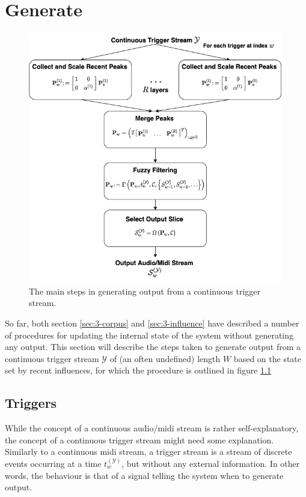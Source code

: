\chapter{Generate}\label{sec:3-generate}
 \begin{figure}[h!]
    \centering        
 	\includegraphics[width=0.99\textwidth]{figures/3-somax-generate.png}
    \caption{The main steps in generating output from a continuous trigger stream.}
    \label{fig:3-somax-generate}
\end{figure}

So far, both section \ref{sec:3-corpus} and \ref{sec:3-influence} have described a number of procedures for updating the internal state of the system without generating any output. This section will describe the steps taken to generate output from a continuous trigger stream $\mathcal Y$ of (an often undefined) length $W$ based on the state set by recent influences, for which the procedure is outlined in figure \ref{fig:3-somax-generate}

\section{Triggers}\label{sec:3-generate-triggers}
While the concept of a continuous audio/midi stream is rather self-explanatory, the concept of a continuous trigger stream might need some explanation. Similarly to a continuous midi stream, a trigger stream is a stream of discrete events occurring at a time $t^{(\mathcal Y)}_w$, but without any external information. In other words, the behaviour is that of a signal telling the system when to generate output.

